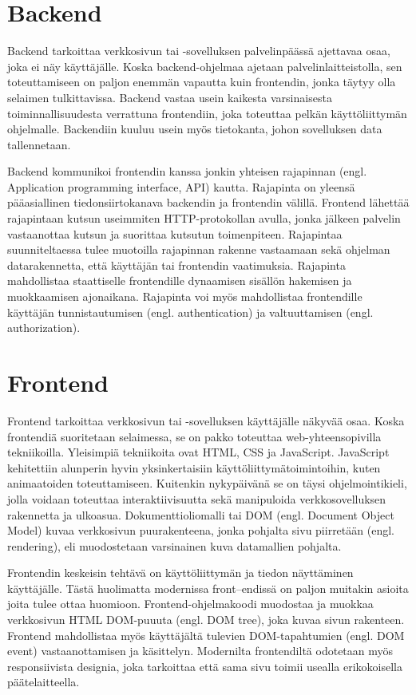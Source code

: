 \section{Backend}
Backend tarkoittaa verkkosivun tai -sovelluksen palvelinpäässä ajettavaa osaa, joka ei näy käyttäjälle. Koska
backend-ohjelmaa ajetaan palvelinlaitteistolla, sen toteuttamiseen on paljon enemmän vapautta kuin frontendin, jonka
täytyy olla selaimen tulkittavissa. Backend vastaa usein kaikesta varsinaisesta toiminnallisuudesta verrattuna
frontendiin, joka toteuttaa pelkän käyttöliittymän ohjelmalle. Backendiin kuuluu usein myös tietokanta, johon sovelluksen
data tallennetaan. \cite{fullstackdeveloper}

Backend kommunikoi frontendin kanssa jonkin yhteisen rajapinnan (engl. Application programming interface, API) kautta.
Rajapinta on yleensä pääasiallinen tiedonsiirtokanava backendin ja frontendin välillä. Frontend lähettää rajapintaan
kutsun useimmiten HTTP-protokollan avulla, jonka jälkeen palvelin vastaanottaa kutsun ja suorittaa kutsutun
toimenpiteen. Rajapintaa suunniteltaessa tulee muotoilla rajapinnan rakenne vastaamaan sekä ohjelman datarakennetta,
että käyttäjän tai frontendin vaatimuksia. Rajapinta mahdollistaa staattiselle frontendille dynaamisen sisällön
hakemisen ja muokkaamisen ajonaikana. Rajapinta voi myös mahdollistaa frontendille käyttäjän tunnistautumisen (engl.
authentication) ja valtuuttamisen (engl. authorization). \cite{fullstackdeveloper}

\section{Frontend}
Frontend tarkoittaa verkkosivun tai -sovelluksen käyttäjälle näkyvää osaa. Koska frontendiä suoritetaan selaimessa,
se on pakko toteuttaa web-yhteensopivilla tekniikoilla. Yleisimpiä tekniikoita ovat HTML, CSS ja JavaScript. JavaScript
kehitettiin alunperin hyvin yksinkertaisiin käyttöliittymätoimintoihin, kuten animaatoiden toteuttamiseen. Kuitenkin
nykypäivänä se on täysi ohjelmointikieli, jolla voidaan toteuttaa interaktiivisuutta sekä manipuloida verkkosovelluksen
rakennetta ja ulkoasua. Dokumenttioliomalli tai DOM (engl. Document Object Model) kuvaa verkkosivun puurakenteena, jonka
pohjalta sivu piirretään (engl. rendering), eli muodostetaan varsinainen kuva datamallien pohjalta.
\cite{fullstackdeveloper}

Frontendin keskeisin tehtävä on käyttöliittymän ja tiedon näyttäminen käyttäjälle. Tästä huolimatta modernissa
front–endissä on paljon muitakin asioita joita tulee ottaa huomioon. Frontend-ohjelmakoodi muodostaa ja muokkaa
verkkosivun HTML DOM-puuuta (engl. DOM tree), joka kuvaa sivun rakenteen. Frontend mahdollistaa myös käyttäjältä
tulevien DOM-tapahtumien (engl. DOM event) vastaanottamisen ja käsittelyn. Modernilta frontendiltä odotetaan myös
responsiivista designia, joka tarkoittaa että sama sivu toimii usealla erikokoisella päätelaitteella.
\cite{bignerdfrontend}

